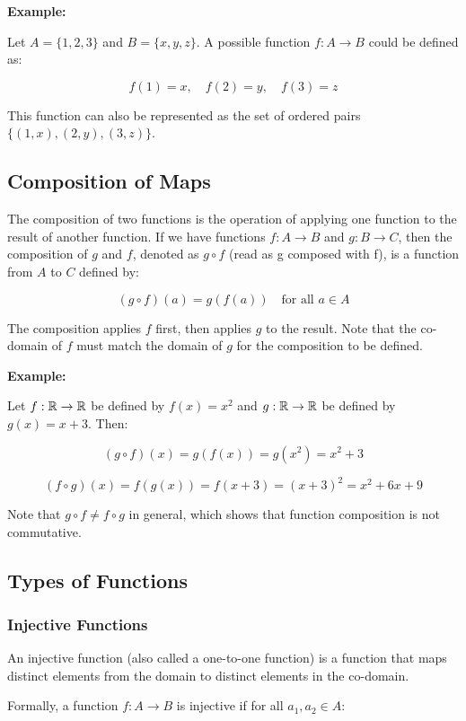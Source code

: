 \textbf{Example:}

Let \(A = \{1, 2, 3\}\) and \(B = \{x, y, z\}\). A possible function \(f: A \to B\) could be defined as:

\[
	f(1) = x, \quad f(2) = y, \quad f(3) = z
\]

This function can also be represented as the set of ordered pairs \(\{(1,x), (2,y), (3,z)\}\).

\subsection{Composition of Maps}

The composition of two functions is the operation of applying one function to the result of another 
function. If we have functions \(f: A \to B\) and \(g: B \rightarrow C\), then the composition of \(g\) 
and \(f\), denoted as \(g \circ f\) (read as g composed with f), is a function from \(A\) to \(C\) defined 
by:

\[
	(g \circ f)(a) = g(f(a)) \quad \text{for all } a \in A
\]

The composition applies \(f\) first, then applies \(g\) to the result. 
Note that the co-domain of \(f\) must match the domain of \(g\) for the composition to be defined.

\textbf{Example:}

Let \(f: \mathbb{R} \to \mathbb{R}\) be defined by \(f(x) = x^2\) and \(g: \mathbb{R} \rightarrow \mathbb{R}\) be defined 
by \(g(x) = x+3\). Then:

\[
	(g \circ f)(x) = g(f(x)) = g(x^2) = x^2 + 3
\]

\[
	(f \circ g)(x) = f(g(x)) = f(x+3) = {(x+3)}^2 = x^2 + 6x + 9
\]

Note that \(g \circ f \neq f \circ g\) in general, which shows that function composition is not 
commutative.

\subsection{Types of Functions}

\subsubsection{Injective Functions}

An injective function (also called a one-to-one function) is a 
function that maps distinct elements from the domain to distinct elements in the co-domain.

Formally, a function \(f: A \to B\) is injective if for all \(a_1, a_2 \in A\):

